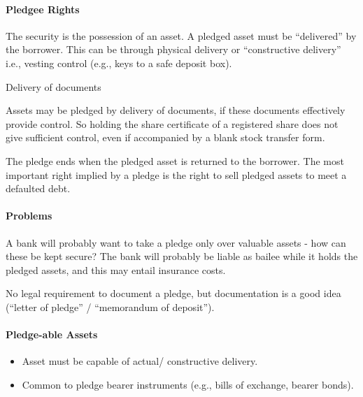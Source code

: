 \documentclass[
]{article}
\providecommand{\tightlist}{%
  \setlength{\itemsep}{0pt}\setlength{\parskip}{0pt}}
\newenvironment{env-486fc4cd-eb32-4215-aaa2-fc77a67eebc5}
{
    \savenotes\tcolorbox[blanker,breakable,left=5pt,borderline west={2pt}{-4pt}{blue}]
}
{
    \endtcolorbox\spewnotes
}
\begin{document}
\hypertarget{pledgee-rights}{%
\paragraph{Pledgee Rights}\label{pledgee-rights}}

The security is the possession of an asset. A pledged asset must be
``delivered'' by the borrower. This can be through physical delivery or
``constructive delivery'' i.e., vesting control (e.g., keys to a safe
deposit box).

\begin{env-486fc4cd-eb32-4215-aaa2-fc77a67eebc5}

Delivery of documents

Assets may be pledged by delivery of documents, if these documents
effectively provide control. So holding the share certificate of a
registered share does not give sufficient control, even if accompanied
by a blank stock transfer form.

\end{env-486fc4cd-eb32-4215-aaa2-fc77a67eebc5}

The pledge ends when the pledged asset is returned to the borrower. The
most important right implied by a pledge is the right to sell pledged
assets to meet a defaulted debt.

\hypertarget{problems}{%
\paragraph{Problems}\label{problems}}

A bank will probably want to take a pledge only over valuable assets -
how can these be kept secure? The bank will probably be liable as bailee
while it holds the pledged assets, and this may entail insurance costs.

No legal requirement to document a pledge, but documentation is a good
idea (``letter of pledge'' / ``memorandum of deposit'').

\hypertarget{pledge-able-assets}{%
\paragraph{Pledge-able Assets}\label{pledge-able-assets}}

\begin{itemize}
\tightlist
\item
  Asset must be capable of actual/ constructive delivery.
\item
  Common to pledge bearer instruments (e.g., bills of exchange, bearer
  bonds).
\end{itemize}
\end{document}
